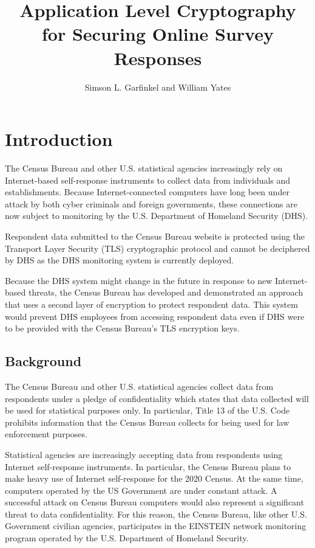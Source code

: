 \documentclass[fleqn,10pt]{wlscirep}
\title{Application Level Cryptography for Securing Online Survey Responses}
\author{Simson L. Garfinkel and William Yates}
\begin{document}
\maketitle

\section{Introduction}

The Census Bureau and other U.S. statistical agencies increasingly
rely on Internet-based self-response instruments to collect
data from individuals and establishments. Because Internet-connected
computers have long been under attack by both cyber criminals and
foreign governments\cite{dick-testimony}, these connections are now
subject to monitoring by the U.S. Department of Homeland
Security (DHS).

Respondent data submitted to the Census Bureau website is protected
using the Transport Layer Security (TLS)\cite{rfc8446} cryptographic
protocol and cannot be deciphered by DHS as the DHS monitoring system
is currently deployed.

Because the DHS system might change in the future in response to
new Internet-based threats, the Census Bureau has developed and demonstrated an
approach that uses a second layer of encryption to protect respondent
data. This system would prevent DHS employees from accessing
respondent data even if DHS were to be provided with the Census
Bureau's TLS encryption keys.

\subsection{Background}

The Census Bureau and other U.S. statistical agencies collect
data from respondents under a pledge of confidentiality which states
that data collected will be used for statistical purposes
only. In particular, Title 13 of the U.S. Code prohibits information
that the Census Bureau collects for being used for law enforcement
purposes.

Statistical agencies are increasingly accepting data from respondents
using Internet self-response instruments. In particular, the Census
Bureau plans to make heavy use of Internet self-response for the 2020
Census.\cite{pennington2016} 
At the same time, computers operated by the US Government are under
constant attack. A successful attack on Census Bureau computers would
also represent a significant threat to data confidentiality. For this
reason, the Census Bureau, like other U.S. Government civilian
agencies, participates in the EINSTEIN network monitoring program
operated by the U.S. Department of Homeland Security.\cite{thompson-feb2017}
\end{document}
